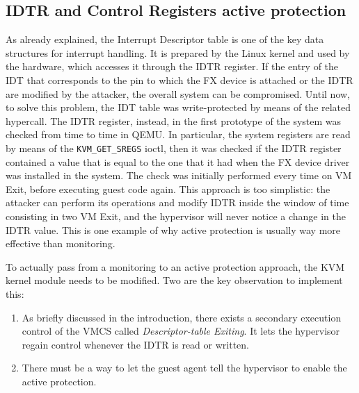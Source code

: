 \subsection{IDTR and Control Registers active protection}
As already explained, the Interrupt Descriptor table is one of the key data structures for interrupt handling. It is prepared by the Linux kernel and used by the hardware, which accesses it through the IDTR register. If the entry of the IDT that corresponds to the pin to which the FX device is attached or the IDTR are modified by the attacker, the overall system can be compromised. Until now, to solve this problem, the IDT table was write-protected by means of the related hypercall. The IDTR register, instead, in the first prototype of the system was checked from time to time in QEMU. In particular, the system registers are read by means of the \texttt{KVM\_GET\_SREGS} ioctl, then it was checked if the IDTR register contained a value that is equal to the one that it had when the FX device driver was installed in the system. The check was initially performed every time on VM Exit, before executing guest code again. This approach is too simplistic: the attacker can perform its operations and modify IDTR inside the window of time consisting in two VM Exit, and the hypervisor will never notice a change in the IDTR value. This is one example of why active protection is usually way more effective than monitoring.
\par 
To actually pass from a monitoring to an active protection approach, the KVM kernel module needs to be modified. Two are the key observation to implement this:
\begin{enumerate}
    \item As briefly discussed in the introduction, there exists a secondary execution control of the VMCS called \emph{Descriptor-table Exiting}. It lets the hypervisor regain control whenever the IDTR is read or written. 
    \item There must be a way to let the guest agent tell the hypervisor to enable the active protection.
\end{enumerate}
